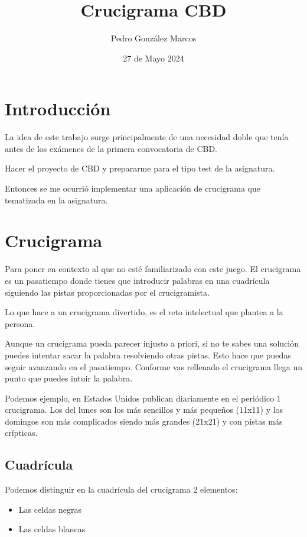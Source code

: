\documentclass[12pt, a4paper]{article}
\title{Crucigrama CBD}
\author{Pedro González Marcos}
\date{27 de Mayo 2024}
\begin{document}
\maketitle

\tableofcontents

\section{Introducción}

La idea de este trabajo surge principalmente de una necesidad doble
que tenía antes de los exámenes de la primera convocatoria de CBD.

Hacer el proyecto de CBD y prepararme para el tipo test de la asignatura.

Entonces se me ocurrió implementar una aplicación de crucigrama que
tematizada en la asignatura. 


\section{Crucigrama}

Para poner en contexto al que no esté familiarizado con este juego.
El crucigrama es un pasatiempo donde tienes que introducir palabras
en una cuadrícula siguiendo las pistas proporcionadas por el crucigramista.

Lo que hace a un crucigrama divertido, es el reto intelectual que plantea
a la persona.

Aunque un crucigrama pueda parecer injusto a priori, si no te sabes
una solución puedes intentar sacar la palabra resolviendo otras pistas.
Esto hace que puedas seguir avanzando en el pasatiempo. Conforme vas
rellenado el crucigrama llega un punto que puedes intuir la palabra.

Podemos ejemplo, en Estados Unidos publican diariamente en el periódico
1 crucigrama. Los del lunes son los más sencillos y más pequeños (11x11) y
los domingos son más complicados siendo más grandes (21x21)  y con pistas
más crípticas.


\subsection{Cuadrícula}

Podemos distinguir en la cuadrícula del crucigrama 2 elementos:

\begin{itemize}
	\item Las celdas negras
	\item Las celdas blancas
\end{itemize}
\end{document}
